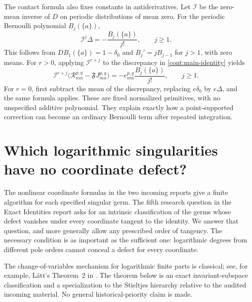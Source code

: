 \documentclass[11pt,a4paper]{article}
\theoremstyle{definition}
\theoremstyle{remark}
\numberwithin{equation}{section}
\begin{document}
The contact formula also fixes constants in antiderivatives.
Let $\mathcal I$ be the zero-mean inverse of $D$ on periodic
distributions of mean zero.  For the periodic Bernoulli polynomial
$B_j(\{a\})$,
\begin{equation}\label{cont:Bernoulli-inverse}
 \mathcal I^j\Delta=-\frac{B_j(\{a\})}{j!},\qquad j\ge1.
\end{equation}
This follows from $DB_1(\{a\})=1-\delta_0$ and
$B_j'=jB_{j-1}$ for $j>1$, with zero means.
For $r>0$, applying $\mathcal I^{r+j}$ to the discrepancy in
\eqref{cont:main-identity} yields
\begin{equation}\label{cont:contact-primitive}
 \mathcal I^{r+j}\bigl(\mathcal R_{mn}^{p,q}
             -\mathfrak FJ_{mn}^{p,q}\bigr)
       =-e_{mn}^{p,q}\frac{B_j(\{a\})}{j!},\qquad j\ge1.
\end{equation}
For $r=0$, first subtract the mean of the discrepancy, replacing
$e\delta_0$ by $e\Delta$, and the same formula applies.
These are fixed normalized primitives, with no unspecified additive
polynomial.  They explain exactly how a point-supported correction
can become an ordinary Bernoulli term after repeated integration.


\section{Which logarithmic singularities have no coordinate defect?}
\label{invg:sec}

The nonlinear coordinate formulas in the two incoming reports give a
finite algorithm for each specified singular germ.  The fifth research
question in the Exact Identities report asks for an intrinsic
classification of the germs whose defect vanishes under every coordinate
tangent to the identity.  We answer that question, and more generally
allow any prescribed order of tangency.  The necessary condition is as
important as the sufficient one: logarithmic degrees from different pole
orders cannot conceal a defect for every coordinate.

The change-of-variables mechanism for logarithmic finite parts is
classical; see, for example, L\"att's Theorem~2 in
\cite{Latt2011}.  The theorem below is an exact invariant-subspace
classification and a specialization to the Stieltjes hierarchy relative
to the audited incoming material.  No general historical-priority claim
is made.
\end{document}
